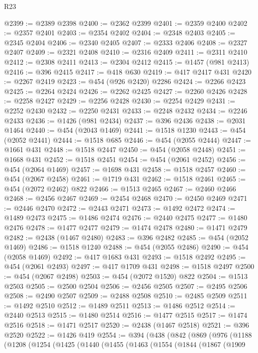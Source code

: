 \begin{lexlean}{R23}
\begin{coremodule}
@2399 := @2389 @2398
@2400 := @2362 @2399
@2401 := @2359 @2400
@2402 := @2357 @2401
@2403 := @2354 @2402
@2404 := @2348 @2403
@2405 := @2345 @2404
@2406 := @2340 @2405
@2407 := @2333 @2406
@2408 := @2327 @2407
@2409 := @2321 @2408
@2410 := @2316 @2409
@2411 := @2311 @2410
@2412 := @2308 @2411
@2413 := @2304 @2412
@2415 := @1457 (@981 @2413)
@2416 := @396 @2415
@2417 := @418 @630
@2419 := @417 @2417 @431
@2420 := @2267 @2419
@2423 := @454 (@926 @2420) @2286
@2424 := @2266 @2423
@2425 := @2264 @2424
@2426 := @2262 @2425
@2427 := @2260 @2426
@2428 := @2258 @2427
@2429 := @2256 @2428
@2430 := @2254 @2429
@2431 := @2252 @2430
@2432 := @2250 @2431
@2433 := @2248 @2432
@2434 := @2246 @2433
@2436 := @1426 (@981 @2434)
@2437 := @396 @2436
@2438 := @2031 @1464
@2440 := @454 (@2043 @1469)
@2441 := @1518 @1230
@2443 := @454 (@2052 @2441)
@2444 := @1518 @685
@2446 := @454 (@2055 @2444)
@2447 := @1661 @431
@2448 := @1518 @2447
@2450 := @454 (@2058 @2448)
@2451 := @1668 @431
@2452 := @1518 @2451
@2454 := @454 (@2061 @2452)
@2456 := @454 (@2064 @1469)
@2457 := @1698 @431
@2458 := @1518 @2457
@2460 := @454 (@2067 @2458)
@2461 := @1719 @431
@2462 := @1518 @2461
@2465 := @454 (@2072 @2462) @822
@2466 := @1513 @2465
@2467 := @2460 @2466
@2468 := @2456 @2467
@2469 := @2454 @2468
@2470 := @2450 @2469
@2471 := @2446 @2470
@2472 := @2443 @2471
@2473 := @1492 @2472
@2474 := @1489 @2473
@2475 := @1486 @2474
@2476 := @2440 @2475
@2477 := @1480 @2476
@2478 := @1477 @2477
@2479 := @1474 @2478
@2480 := @1471 @2479
@2482 := @2438 (@1467 @2480)
@2483 := @396 @2482
@2485 := @454 (@2052 @1469)
@2486 := @1518 @1240
@2488 := @454 (@2055 @2486)
@2490 := @454 (@2058 @1469)
@2492 := @417 @1683 @431
@2493 := @1518 @2492
@2495 := @454 (@2061 @2493)
@2497 := @417 @1709 @431
@2498 := @1518 @2497
@2500 := @454 (@2067 @2498)
@2503 := @454 (@2072 @1520) @822
@2504 := @1513 @2503
@2505 := @2500 @2504
@2506 := @2456 @2505
@2507 := @2495 @2506
@2508 := @2490 @2507
@2509 := @2488 @2508
@2510 := @2485 @2509
@2511 := @1492 @2510
@2512 := @1489 @2511
@2513 := @1486 @2512
@2514 := @2440 @2513
@2515 := @1480 @2514
@2516 := @1477 @2515
@2517 := @1474 @2516
@2518 := @1471 @2517
@2520 := @2438 (@1467 @2518)
@2521 := @396 @2520
@2522 := @1426 @419
@2554 := @394
    (@438
      (@842
        (@869
          (@976
            (@1188
              (@1208
                (@1254
                  (@1425
                    (@1440
                      (@1455
                        (@1463
                          (@1554
                            (@1844
                              (@1867
                                (@1909

\end{coremodule}
\end{lexlean}
